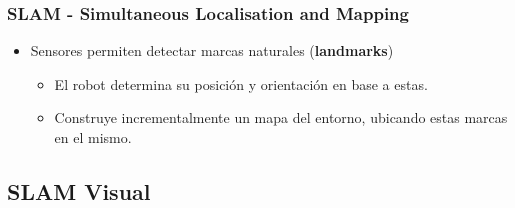 \documentclass[compress]{beamer}
\begin{document}
\begin{frame}
	\frametitle{SLAM - Simultaneous Localisation and Mapping}

	\begin{itemize}
        \item Sensores permiten detectar marcas naturales (\textbf{landmarks})
        \begin{itemize}
            \item El robot determina su posición y orientación en base a estas.
            \item Construye incrementalmente un mapa del entorno, ubicando estas marcas en el mismo.
        \end{itemize}
    \end{itemize}

	\vspace{-1em}
	\begin{figure}[!htb]
		\centering
		\hfill
	\end{figure}

\end{frame}


\subsection{SLAM Visual}
\end{document}
